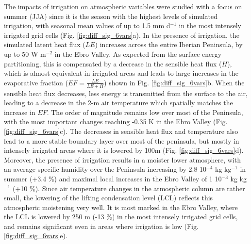 The impacts of irrigation on atmospheric variables were studied with a focus on summer (JJA) since it is the season with the highest levels of simulated irrigation, with seasonal mean values of up to 1.5 mm d$^{-1}$ in the most intensely irrigated grid cells (Fig. \ref{fig:diff_sig_6vars}a).
In the presence of irrigation, the simulated latent heat flux ($LE$) increases across the entire Iberian Peninsula, by up to 50 W m$^{-2}$ in the Ebro Valley. As expected from the surface energy partitioning, this is compensated by a decrease in the sensible heat flux ($H$), which is almost equivalent in irrigated areas and leads to large increases in the evaporative fraction ($EF = \frac{LE}{LE+H}$) shown in Fig. \ref{fig:diff_sig_6vars}b.
When the sensible heat flux decreases, less energy is transmitted from the surface to the air, leading to a decrease in the 2-m air temperature which spatially matches the increase in $EF$. The order of magnitude remains low over most of the Peninsula, with the most important changes reaching -0.35 K in the Ebro Valley (Fig. \ref{fig:diff_sig_6vars}c).
The decreases in sensible heat flux and temperature also lead to a more stable boundary layer over most of the peninsula, but mostly in intensely irrigated areas where it is lowered by 100m (Fig. \ref{fig:diff_sig_6vars}d).
Moreover, the presence of irrigation results in a moister lower atmosphere, with an average specific humidity over the Peninsula increasing by 2.8 10$^{-4}$ kg kg$^{-1}$ in summer (+3.4 \%) and maximal local increases in the Ebro Valley of 1 10$^{-3}$ kg kg$^{-1}$ (+10 \%). Since air temperature changes in the atmospheric column are rather small, the lowering of the lifting condensation level (LCL) reflects this atmospheric moistening very well. It is most marked in the Ebro Valley, where the LCL is lowered by 250 m (-13 \%) in the most intensely irrigated grid cells, and remains significant even in areas where irrigation is low (Fig. \ref{fig:diff_sig_6vars}e).

